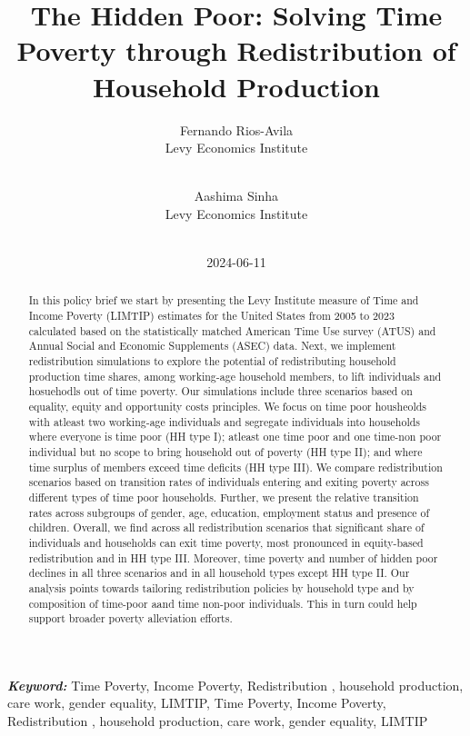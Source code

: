 \documentclass[
  11pt,
]{article}
\title{The Hidden Poor: Solving Time Poverty through Redistribution of
Household Production}
\author{
Fernando Rios-Avila\\
Levy Economics Institute\\
\\
\and 
Aashima Sinha\\
Levy Economics Institute\\
\\
}
\date{2024-06-11}
\begin{document}
\def\spacingset#1{\renewcommand{\baselinestretch}%
{#1}\small\normalsize} \spacingset{1}


\maketitle
\begin{abstract}
In this policy brief we start by presenting the Levy Institute measure
of Time and Income Poverty (LIMTIP) estimates for the United States from
2005 to 2023 calculated based on the statistically matched American Time
Use survey (ATUS) and Annual Social and Economic Supplements (ASEC)
data. Next, we implement redistribution simulations to explore the
potential of redistributing household production time shares, among
working-age household members, to lift individuals and hosuehodls out of
time poverty. Our simulations include three scenarios based on equality,
equity and opportunity costs principles. We focus on time poor
housheolds with atleast two working-age individuals and segregate
individuals into households where everyone is time poor (HH type I);
atleast one time poor and one time-non poor individual but no scope to
bring household out of poverty (HH type II); and where time surplus of
members exceed time deficits (HH type III). We compare redistribution
scenarios based on transition rates of individuals entering and exiting
poverty across different types of time poor households. Further, we
present the relative transition rates across subgroups of gender, age,
education, employment status and presence of children. Overall, we find
across all redistribution scenarios that significant share of
individuals and households can exit time poverty, most pronounced in
equity-based redistribution and in HH type III. Moreover, time poverty
and number of hidden poor declines in all three scenarios and in all
household types except HH type II. Our analysis points towards tailoring
redistribution policies by household type and by composition of
time-poor aand time non-poor individuals. This in turn could help
support broader poverty alleviation efforts.
\end{abstract}
 
\vspace{.2in}

\textbf{\textit{Keyword: }}
    Time Poverty, Income Poverty, Redistribution , household production,
care work, gender equality, LIMTIP, 
    Time Poverty, Income Poverty, Redistribution , household production,
care work, gender equality, LIMTIP 
\end{document}
